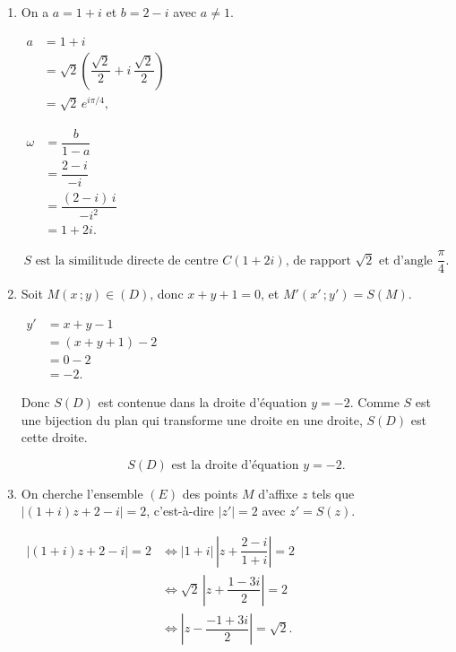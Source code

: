 \documentclass[12pt,a4paper]{article}
\begin{document}
\begin{enumerate}
\begin{enumerate}
        \[
        \boxed{S : z' = (1 + i)\,z + 2 - i}
        \]

        \item On a $a = 1 + i$ et $b = 2 - i$ avec $a \neq 1$.

        $
        \begin{aligned}
        a &= 1 + i \\[1mm]
          &= \sqrt2\left(\dfrac{\sqrt2}{2} + i\,\dfrac{\sqrt2}{2}\right) \\[1mm]
          &= \sqrt2\,e^{i\pi/4},
        \end{aligned}
        $

        $
        \begin{aligned}
        \omega &= \dfrac{b}{1 - a} \\[1mm]
               &= \dfrac{2 - i}{-i} \\[1mm]
               &= \dfrac{(2 - i)\,i}{-i^2} \\[1mm]
               &= 1 + 2i.
        \end{aligned}
        $

        \[
        \boxed{S \text{ est la similitude directe de centre } C(1 + 2i) \text{, de rapport } \sqrt2 \text{ et d'angle } \dfrac{\pi}{4}.}
        \]

        \item Soit $M(x\,;y) \in (D)$, donc $x + y + 1 = 0$, et $M'(x'\,;y') = S(M)$.

        $
        \begin{aligned}
        y' &= x + y - 1 \\[1mm]
           &= (x + y + 1) - 2 \\[1mm]
           &= 0 - 2 \\[1mm]
           &= -2.
        \end{aligned}
        $

        Donc $S(D)$ est contenue dans la droite d'équation $y = -2$. Comme $S$ est une bijection du plan qui transforme une droite en une droite, $S(D)$ est cette droite.

        \[
        \boxed{S(D) \text{ est la droite d'équation } y = -2.}
        \]

        \item On cherche l'ensemble $(E)$ des points $M$ d'affixe $z$ tels que $|(1 + i)z + 2 - i| = 2$, c'est-à-dire $|z'| = 2$ avec $z' = S(z)$.

        $
        \begin{aligned}
        |(1 + i)z + 2 - i| = 2 &\iff |1 + i|\,\left|z + \dfrac{2 - i}{1 + i}\right| = 2 \\[1mm]
                               &\iff \sqrt2\,\left|z + \dfrac{1 - 3i}{2}\right| = 2 \\[1mm]
                               &\iff \left|z - \dfrac{-1 + 3i}{2}\right| = \sqrt2.
        \end{aligned}
        $


\end{enumerate}
\end{enumerate}
\end{document}
